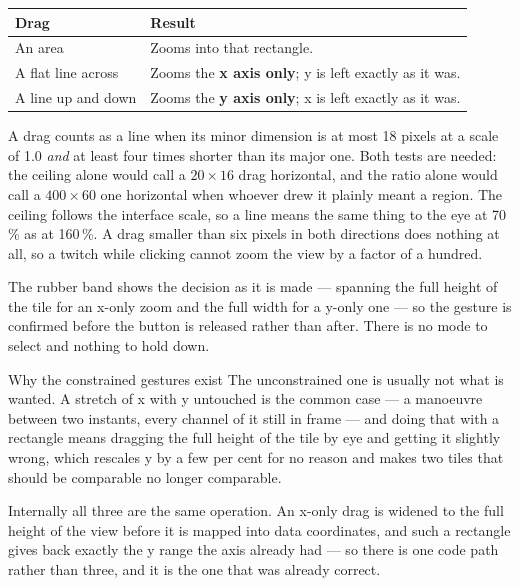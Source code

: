 \documentclass[11pt,a4paper,oneside]{report}
\begin{document}
\begin{center}
\small
\begin{tabular}{@{}p{}p{}@{}}
\toprule
\textbf{Drag} & \textbf{Result} \\
\midrule
An area & Zooms into that rectangle. \\
A flat line across & Zooms the \textbf{x axis only}; y is left exactly as it was. \\
A line up and down & Zooms the \textbf{y axis only}; x is left exactly as it was. \\
\bottomrule
\end{tabular}
\end{center}

A drag counts as a line when its minor dimension is at most 18 pixels at a
scale of 1.0 \emph{and} at least four times shorter than its major one. Both
tests are needed: the ceiling alone would call a $20 \times 16$ drag
horizontal, and the ratio alone would call a $400 \times 60$ one horizontal
when whoever drew it plainly meant a region. The ceiling follows the interface
scale, so a line means the same thing to the eye at 70\,\% as at 160\,\%.
A drag smaller than six pixels in both directions does nothing at all, so a
twitch while clicking cannot zoom the view by a factor of a hundred.

The rubber band shows the decision as it is made --- spanning the full height of
the tile for an x-only zoom and the full width for a y-only one --- so the
gesture is confirmed before the button is released rather than after. There is
no mode to select and nothing to hold down.

\begin{aoenote}{Why the constrained gestures exist}
The unconstrained one is usually not what is wanted. A stretch of x with y
untouched is the common case --- a manoeuvre between two instants, every channel
of it still in frame --- and doing that with a rectangle means dragging the full
height of the tile by eye and getting it slightly wrong, which rescales y by a
few per cent for no reason and makes two tiles that should be comparable no
longer comparable.

Internally all three are the same operation. An x-only drag is widened to the
full height of the view before it is mapped into data coordinates, and such a
rectangle gives back exactly the y range the axis already had --- so there is
one code path rather than three, and it is the one that was already correct.
\end{aoenote}
\end{document}
